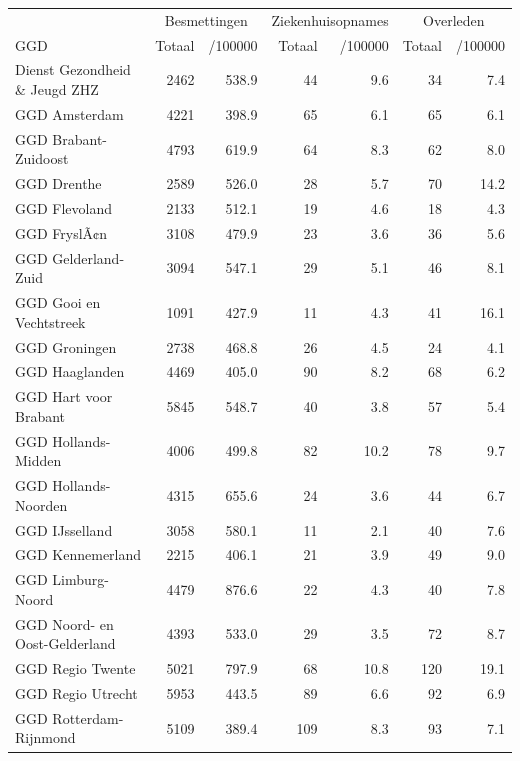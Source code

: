 \documentclass[
  english,
  man,floatsintext]{apa6}
\begin{document}
\begin{table}[H]
\centering\begingroup\fontsize{10}{12}\selectfont

\begin{threeparttable}
\begin{tabular}{lrrrrrr}
\toprule
\multicolumn{1}{c}{ } & \multicolumn{2}{c}{Besmettingen} & \multicolumn{2}{c}{Ziekenhuisopnames} & \multicolumn{2}{c}{Overleden} \\
\cmidrule(l{3pt}r{3pt}){2-3} \cmidrule(l{3pt}r{3pt}){4-5} \cmidrule(l{3pt}r{3pt}){6-7}
GGD & Totaal & /100000 & Totaal & /100000 & Totaal & /100000\\
\midrule
Dienst Gezondheid \& Jeugd ZHZ & 2462 & 538.9 & 44 & 9.6 & 34 & 7.4\\
GGD Amsterdam & 4221 & 398.9 & 65 & 6.1 & 65 & 6.1\\
GGD Brabant-Zuidoost & 4793 & 619.9 & 64 & 8.3 & 62 & 8.0\\
GGD Drenthe & 2589 & 526.0 & 28 & 5.7 & 70 & 14.2\\
GGD Flevoland & 2133 & 512.1 & 19 & 4.6 & 18 & 4.3\\
GGD FryslÃ¢n & 3108 & 479.9 & 23 & 3.6 & 36 & 5.6\\
GGD Gelderland-Zuid & 3094 & 547.1 & 29 & 5.1 & 46 & 8.1\\
GGD Gooi en Vechtstreek & 1091 & 427.9 & 11 & 4.3 & 41 & 16.1\\
GGD Groningen & 2738 & 468.8 & 26 & 4.5 & 24 & 4.1\\
GGD Haaglanden & 4469 & 405.0 & 90 & 8.2 & 68 & 6.2\\
GGD Hart voor Brabant & 5845 & 548.7 & 40 & 3.8 & 57 & 5.4\\
GGD Hollands-Midden & 4006 & 499.8 & 82 & 10.2 & 78 & 9.7\\
GGD Hollands-Noorden & 4315 & 655.6 & 24 & 3.6 & 44 & 6.7\\
GGD IJsselland & 3058 & 580.1 & 11 & 2.1 & 40 & 7.6\\
GGD Kennemerland & 2215 & 406.1 & 21 & 3.9 & 49 & 9.0\\
GGD Limburg-Noord & 4479 & 876.6 & 22 & 4.3 & 40 & 7.8\\
GGD Noord- en Oost-Gelderland & 4393 & 533.0 & 29 & 3.5 & 72 & 8.7\\
GGD Regio Twente & 5021 & 797.9 & 68 & 10.8 & 120 & 19.1\\
GGD Regio Utrecht & 5953 & 443.5 & 89 & 6.6 & 92 & 6.9\\
GGD Rotterdam-Rijnmond & 5109 & 389.4 & 109 & 8.3 & 93 & 7.1\\

\end{tabular}
\end{threeparttable}
\end{table}
\end{document}

